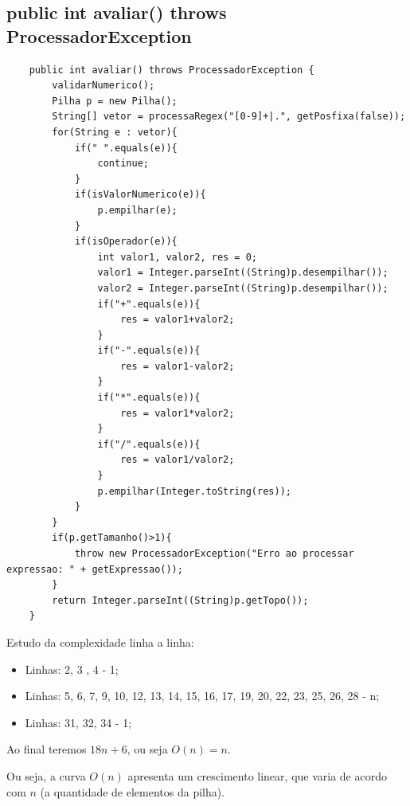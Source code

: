 \documentclass[a4paper,11pt]{article}
\begin{document}
\subsection{public int avaliar() throws ProcessadorException}
\begin{lstlisting}
    public int avaliar() throws ProcessadorException {
        validarNumerico();        
        Pilha p = new Pilha();
        String[] vetor = processaRegex("[0-9]+|.", getPosfixa(false));
        for(String e : vetor){
            if(" ".equals(e)){
                continue;
            }            
            if(isValorNumerico(e)){
                p.empilhar(e);
            }            
            if(isOperador(e)){
                int valor1, valor2, res = 0;
                valor1 = Integer.parseInt((String)p.desempilhar());
                valor2 = Integer.parseInt((String)p.desempilhar());
                if("+".equals(e)){
                    res = valor1+valor2;
                }                
                if("-".equals(e)){
                    res = valor1-valor2;
                }                
                if("*".equals(e)){
                    res = valor1*valor2;
                }                
                if("/".equals(e)){
                    res = valor1/valor2;
                }              
                p.empilhar(Integer.toString(res));
            }
        }
        if(p.getTamanho()>1){
            throw new ProcessadorException("Erro ao processar expressao: " + getExpressao());
        }
        return Integer.parseInt((String)p.getTopo());
    }
\end{lstlisting}

Estudo da complexidade linha a linha:
\begin{itemize}
  \item Linhas: 2, 3 , 4 - 1;
  \item Linhas: 5, 6, 7, 9, 10, 12, 13, 14, 15, 16, 17, 19, 20, 22, 23, 25, 26,
  28 - n;
  \item Linhas: 31, 32, 34 - 1;
\end{itemize}
Ao final teremos \(18n+6\), ou seja \(O(n)=n\).

Ou seja, a curva $O(n)$ apresenta um crescimento linear, que varia de acordo com $n$ (a quantidade de elementos da pilha).
\end{document}
